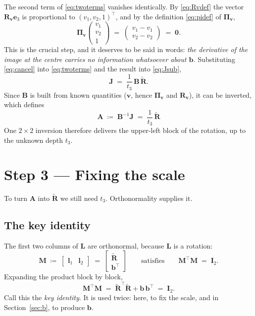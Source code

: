 \documentclass[11pt,a4paper]{article}
\theoremstyle{remark}
\newcommand{\Rtil}{\widetilde{\mathbf{R}}}
\newcommand{\Amat}{\mathbf{A}}
\newcommand{\Bmat}{\mathbf{B}}
\newcommand{\Jmat}{\mathbf{J}}
\newcommand{\Lmat}{\mathbf{L}}
\newcommand{\Mmat}{\mathbf{M}}
\newcommand{\Rvee}{\mathbf{R}_{\vvec}}
\newcommand{\Pimat}{\boldsymbol{\Pi}_{\vvec}}
\newcommand{\Idm}{\mathbf{I}}
\newcommand{\bvec}{\mathbf{b}}
\newcommand{\evec}{\mathbf{e}}
\newcommand{\lvec}{\mathbf{l}}
\newcommand{\vvec}{\mathbf{v}}
\newcommand{\zerovec}{\mathbf{0}}
\begin{document}
The second term of \eqref{eq:twoterms} vanishes identically. By
\eqref{eq:Rvdef} the vector $\Rvee\evec_3$ is proportional to
$(v_1,v_2,1)^{\top}$, and by the definition \eqref{eq:pidef} of $\Pimat$,
\begin{equation}
  \Pimat \begin{pmatrix} v_1 \\ v_2 \\ 1 \end{pmatrix}
  \;=\;
  \begin{pmatrix} v_1 - v_1 \\ v_2 - v_2 \end{pmatrix}
  \;=\; \zerovec .
  \label{eq:cancel}
\end{equation}
This is the crucial step, and it deserves to be said in words: \emph{the
derivative of the image at the centre carries no information whatsoever about
$\bvec$.} Substituting \eqref{eq:cancel} into \eqref{eq:twoterms} and the result
into \eqref{eq:Jsub},
\begin{equation}
  \Jmat \;=\; \frac{1}{t_3}\,\Bmat\,\Rtil .
  \label{eq:JBR}
\end{equation}
Since $\Bmat$ is built from known quantities ($\vvec$, hence $\Pimat$ and
$\Rvee$), it can be inverted, which defines
\begin{equation}
  \boxed{\;
  \Amat \;\coloneqq\; \Bmat^{-1}\Jmat \;=\; \frac{1}{t_3}\,\Rtil
  \;}
  \label{eq:Adef}
\end{equation}
One $2\times2$ inversion therefore delivers the upper-left block of the
rotation, up to the unknown depth $t_3$.

\section{Step 3 --- Fixing the scale}

To turn $\Amat$ into $\Rtil$ we still need $t_3$. Orthonormality supplies it.

\subsection{The key identity}

The first two columns of $\Lmat$ are orthonormal, because $\Lmat$ is a rotation:
\begin{equation}
  \Mmat \;\coloneqq\;
  \begin{bmatrix} \lvec_1 & \lvec_2 \end{bmatrix}
  \;=\;
  \begin{bmatrix} \Rtil \\[2pt] \bvec^{\top} \end{bmatrix}
  \qquad \text{satisfies} \qquad
  \Mmat^{\top}\Mmat \;=\; \Idm_2 .
\end{equation}
Expanding the product block by block,
\begin{equation}
  \Mmat^{\top}\Mmat
  \;=\; \Rtil^{\top}\Rtil + \bvec\,\bvec^{\top}
  \;=\; \Idm_2 .
  \label{eq:key}
\end{equation}
Call this the \emph{key identity}. It is used twice: here, to fix the scale, and
in Section~\ref{sec:b}, to produce $\bvec$.
\end{document}

